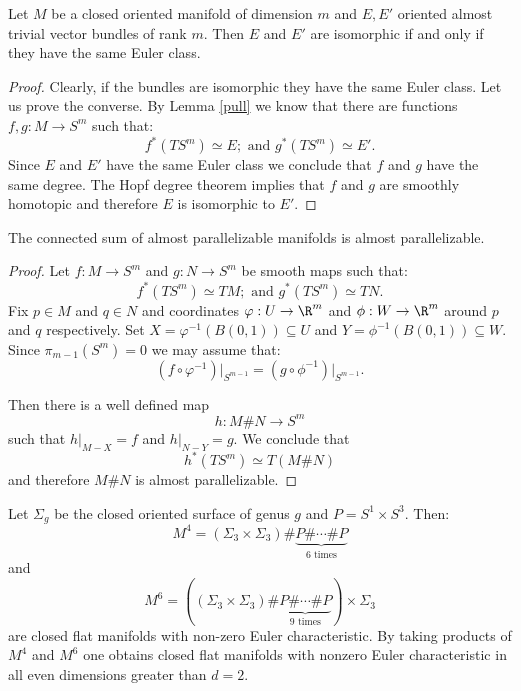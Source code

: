 \begin{lemma}\label{Euler}
	Let $M$ be a closed oriented manifold of dimension $m$ and $E,E'$ oriented almost trivial vector bundles of rank $m$.
	Then $E$ and $E'$ are isomorphic if and only if they have the same Euler class.
\end{lemma}
\begin{proof}
	Clearly, if the bundles are isomorphic they have the same Euler class. Let us prove the converse. By Lemma \ref{pull}
	we know that there are functions $f,g:M \rightarrow S^m$ such that:
	\[ f^*(TS^m) \simeq E; \text{ and } g^*(TS^m)\simeq E'.\]
	Since $E$ and $E'$ have the same Euler class we conclude that $f$ and $g$ have the same degree. The Hopf degree theorem implies that $f$ and $g$ are smoothly homotopic and therefore $E $ is isomorphic to $E'$.
\end{proof}

\begin{lemma}\label{connected}
	The connected sum of almost parallelizable manifolds is almost parallelizable.
\end{lemma}
\begin{proof}
	Let $f:M \rightarrow S^m$ and $g: N \rightarrow S^m$ be smooth maps such that:
	\[ f^*(TS^m) \simeq TM; \text{ and } g^*(TS^m)\simeq TN.\]
	Fix $p \in M$  and $q \in N$ and coordinates $\varphi: U \rightarrow \R^m$ and $\phi: W \rightarrow \R^m$ around
	$p$ and $q$ respectively. Set $X=\varphi^{-1}(B(0,1))\subseteq U$ and $Y= \phi^{-1}(B(0,1))\subseteq W$. Since $\pi_{m-1}(S^m)=0$ we may assume that:
	\[ (f \circ \varphi^{-1})\vert_{S^{m-1}}=(g \circ \phi^{-1}) \vert_{S^{m-1}}.\]
	
	Then there is a well defined map
	\[ h: M\#N \rightarrow S^m\]
	such that $h\vert_{M-X}=f$ and $h\vert_{N-Y}=g$. We conclude that \[ h^*(TS^m)\simeq T(M \#N)\]
	and therefore $M \#N$ is almost parallelizable.
\end{proof}


\begin{theorem}[Smillie]
	Let $\Sigma_g$ be the closed oriented surface of genus $g$ and $P= S^1 \times S^3$. Then:
	\[M^4= (\Sigma_3 \times \Sigma_3)\# \underbrace{ P\# \cdots \#P}_{6\text{ times}}\]
	and
	\[M^6=((\Sigma_3 \times \Sigma_3)\# \underbrace{ P\# \cdots \#P}_{9\text{ times}})\times \Sigma_3\]
	are closed flat manifolds with non-zero Euler characteristic. By taking products of $M^4$ and $M^6$ one obtains
	closed flat manifolds with nonzero Euler characteristic in all even dimensions greater than $d=2$.
\end{theorem}

